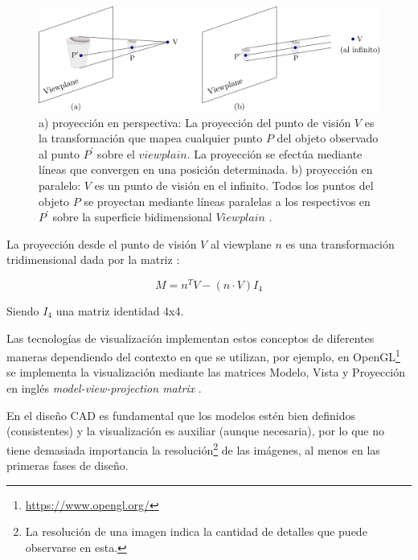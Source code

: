 \begin{figure}[h]
    \includegraphics[width=14cm]{Img/GEO/geo-view11.png}
    \centering
    \caption{\footnotesize{a) proyección en perspectiva: La proyección del punto de visión $V$ es la transformación que mapea cualquier punto $P$ del objeto observado al punto $P^{\prime}$ sobre el $viewplain$. La proyección se efectúa mediante líneas que convergen en una posición determinada.
    b) proyección en paralelo:  $V$ es un punto de visión en el infinito. Todos los puntos del objeto $P$ se proyectan  mediante líneas paralelas a los respectivos en $P^{\prime}$ sobre la superficie bidimensional $Viewplain$ \citep{marsh2005applied}.}}
    \label{geo-view1}
\end{figure}

La proyección desde el punto de visión $V$ al viewplane $n$ es una transformación tridimensional dada por la matriz \citep{marsh2005applied}:

\begin{equation}
M = n^TV - (n  · V)I_4
\end{equation}

Siendo $I_4$ una matriz identidad 4x4.

\vspace{5mm}

Las tecnologías de visualización implementan estos conceptos de diferentes maneras dependiendo del contexto en que se utilizan, por ejemplo, en OpenGL\footnote{\url{https://www.opengl.org/}} se implementa la visualización mediante las matrices Modelo, Vista y Proyección en inglés \textit{model-view-projection matrix} \citep{kessenich2016opengl}.

En el diseño CAD es fundamental que los modelos estén bien definidos (consistentes) y la visualización es auxiliar (aunque necesaria), por lo que no tiene demasiada importancia la resolución\footnote{La resolución de una imagen indica la cantidad de detalles que puede observarse en esta. } de las imágenes, al menos en las primeras fases de diseño.\newline




